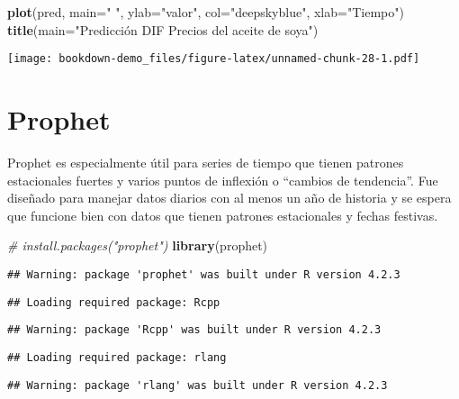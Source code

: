 \documentclass[
]{book}
\newenvironment{Shaded}{\begin{snugshade}}{\end{snugshade}}
\newcommand{\AttributeTok}[1]{\textcolor[rgb]{0.13,0.29,0.53}{#1}}
\newcommand{\CommentTok}[1]{\textcolor[rgb]{0.56,0.35,0.01}{\textit{#1}}}
\newcommand{\FunctionTok}[1]{\textcolor[rgb]{0.13,0.29,0.53}{\textbf{#1}}}
\newcommand{\NormalTok}[1]{#1}
\newcommand{\StringTok}[1]{\textcolor[rgb]{0.31,0.60,0.02}{#1}}
\begin{document}
\begin{Shaded}
\begin{Highlighting}[]
\FunctionTok{plot}\NormalTok{(pred, }\AttributeTok{main=}\StringTok{" "}\NormalTok{, }\AttributeTok{ylab=}\StringTok{"valor"}\NormalTok{, }\AttributeTok{col=}\StringTok{"deepskyblue"}\NormalTok{, }\AttributeTok{xlab=}\StringTok{"Tiempo"}\NormalTok{)}
\FunctionTok{title}\NormalTok{(}\AttributeTok{main=}\StringTok{"Predicción DIF Precios del aceite de soya"}\NormalTok{)}
\end{Highlighting}
\end{Shaded}

\texttt{[image: bookdown-demo\_files/figure-latex/unnamed-chunk-28-1.pdf]}

\hypertarget{prophet}{%
\chapter{Prophet}\label{prophet}}

Prophet es especialmente útil para series de tiempo que tienen patrones estacionales fuertes y varios puntos de inflexión o ``cambios de tendencia''. Fue diseñado para manejar datos diarios con al menos un año de historia y se espera que funcione bien con datos que tienen patrones estacionales y fechas festivas.

\begin{Shaded}
\begin{Highlighting}[]
\CommentTok{\# install.packages("prophet")}
\FunctionTok{library}\NormalTok{(prophet)}
\end{Highlighting}
\end{Shaded}

\begin{verbatim}
## Warning: package 'prophet' was built under R version 4.2.3
\end{verbatim}

\begin{verbatim}
## Loading required package: Rcpp
\end{verbatim}

\begin{verbatim}
## Warning: package 'Rcpp' was built under R version 4.2.3
\end{verbatim}

\begin{verbatim}
## Loading required package: rlang
\end{verbatim}

\begin{verbatim}
## Warning: package 'rlang' was built under R version 4.2.3
\end{verbatim}
\end{document}
